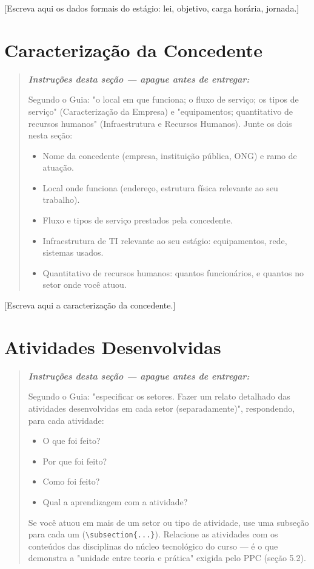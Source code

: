 \documentclass[article,12pt,a4paper]{abntex2}
\newenvironment{instrucoes}{%
  \begin{quotation}\footnotesize\itshape
  \noindent\textbf{\upshape Instruções desta seção — apague antes de entregar:}\par\smallskip
}{%
  \end{quotation}
}
\begin{document}
[Escreva aqui os dados formais do estágio: lei, objetivo, carga horária, jornada.]

\section{Caracterização da Concedente}

\begin{instrucoes}
Segundo o Guia: "o local em que funciona; o fluxo de serviço; os tipos de serviço" (Caracterização da Empresa) e "equipamentos; quantitativo de recursos humanos" (Infraestrutura e Recursos Humanos). Junte os dois nesta seção:
\begin{itemize}
  \item Nome da concedente (empresa, instituição pública, ONG) e ramo de atuação.
  \item Local onde funciona (endereço, estrutura física relevante ao seu trabalho).
  \item Fluxo e tipos de serviço prestados pela concedente.
  \item Infraestrutura de TI relevante ao seu estágio: equipamentos, rede, sistemas usados.
  \item Quantitativo de recursos humanos: quantos funcionários, e quantos no setor onde você atuou.
\end{itemize}
\end{instrucoes}

[Escreva aqui a caracterização da concedente.]

\section{Atividades Desenvolvidas}

\begin{instrucoes}
Segundo o Guia: "especificar os setores. Fazer um relato detalhado das atividades desenvolvidas em cada setor (separadamente)", respondendo, para cada atividade:
\begin{itemize}
  \item O que foi feito?
  \item Por que foi feito?
  \item Como foi feito?
  \item Qual a aprendizagem com a atividade?
\end{itemize}
Se você atuou em mais de um setor ou tipo de atividade, use uma subseção para cada um (\texttt{\textbackslash subsection\{...\}}). Relacione as atividades com os conteúdos das disciplinas do núcleo tecnológico do curso — é o que demonstra a "unidade entre teoria e prática" exigida pelo PPC (seção 5.2).
\end{instrucoes}
\end{document}
